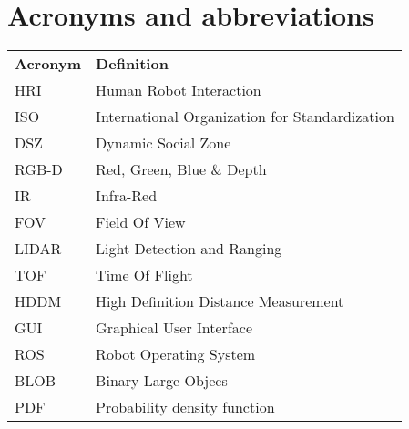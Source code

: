 \chapter*{Acronyms and abbreviations}\label{ch:acronyms}

\begin{table}[H]
\begin{tabular}{ll}
\textbf{Acronym} & \textbf{Definition} \\
HRI & Human Robot Interaction \\
ISO & International Organization for Standardization\\
DSZ & Dynamic Social Zone\\
RGB-D & Red, Green, Blue \& Depth\\
IR & Infra-Red\\
FOV & Field Of View  \\
LIDAR & Light Detection and Ranging\\
TOF & Time Of Flight\\
HDDM & High Definition Distance Measurement\\
GUI & Graphical User Interface\\
ROS & Robot Operating System\\
BLOB & Binary Large Objecs\\
PDF & Probability density function
\end{tabular}
\end{table}